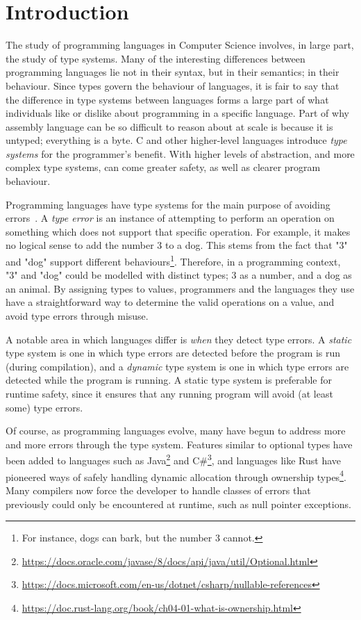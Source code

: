 \chapter{Introduction}

The study of programming languages in Computer Science involves, in large part, the study of type systems. Many of the interesting differences between programming languages lie not in their syntax, but in their semantics; in their behaviour. Since types govern the behaviour of languages, it is fair to say that the difference in type systems between languages forms a large part of what individuals like or dislike about programming in a specific language. Part of why assembly language can be so difficult to reason about at scale is because it is untyped; everything is a byte. C and other higher-level languages introduce \emph{type systems} for the programmer's benefit. With higher levels of abstraction, and more complex type systems, can come greater safety, as well as clearer program behaviour.

Programming languages have type systems for the main purpose of avoiding errors~\cite{cardellitypes}. A \emph{type error} is an instance of attempting to perform an operation on something which does not support that specific operation. For example, it makes no logical sense to add the number 3 to a dog. This stems from the fact that "3" and "dog" support different behaviours\footnote{For instance, dogs can bark, but the number 3 cannot.}. Therefore, in a programming context, "3" and "dog" could be modelled with distinct types; 3 as a number, and a dog as an animal. By assigning types to values, programmers and the languages they use have a straightforward way to determine the valid operations on a value, and avoid type errors through misuse.

A notable area in which languages differ is \emph{when} they detect type errors. A \emph{static} type system is one in which type errors are detected before the program is run (during compilation), and a \emph{dynamic} type system is one in which type errors are detected while the program is running. A static type system is preferable for runtime safety, since it ensures that any running program will avoid (at least some) type errors.

Of course, as programming languages evolve, many have begun to address more and more errors through the type system. Features similar to optional types have been added to languages such as Java\footnote{\url{https://docs.oracle.com/javase/8/docs/api/java/util/Optional.html}} and C\#\footnote{\url{https://docs.microsoft.com/en-us/dotnet/csharp/nullable-references}}, and languages like Rust have pioneered ways of safely handling dynamic allocation through ownership types\footnote{\url{https://doc.rust-lang.org/book/ch04-01-what-is-ownership.html}}. Many compilers now force the developer to handle classes of errors that previously could only be encountered at runtime, such as null pointer exceptions.

